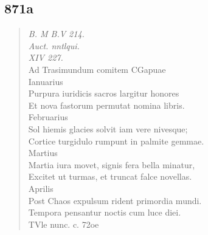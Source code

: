 \documentclass[11pt, a4paper]{report}
\begin{document}
            \subsection*{871a}
      \begin{verse}
      \textit{B. M B.V 214.} \\ \textit{Auct. nntlqui.} \\ \textit{XIV 227.} \\ Ad Trasimundum comitem CGapuae \\ Ianuarius \\ Purpura iuridicis sacros largitur honores \\ Et nova fastorum permutat nomina libris. \\ Februarius \\ Sol hiemis glacies solvit iam vere nivesque; \\ Cortice turgidulo rumpunt in palmite gemmae. \\ Martius \\ Martia iura movet, signis fera bella minatur, \\ Excitet ut turmas, et truncat falce novellas. \\ Aprilis \\ Post Chaos expulsum rident primordia mundi. \\ Tempora pensantur noctis cum luce diei. \\ 
        ﻿\pagebreak 
     \marginpar{[874]} TVle nunc. c. 72oe \\ 
      \end{verse}
  
\end{document}
